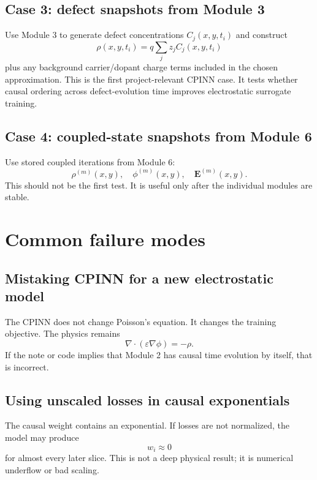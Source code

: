 \documentclass[11pt]{article}
\newcommand{\Evec}{\mathbf{E}}
\begin{document}
\subsection{Case 3: defect snapshots from Module 3}

Use Module 3 to generate defect concentrations $C_j(x,y,t_i)$ and construct
\begin{equation}
\rho(x,y,t_i)=q\sum_j z_jC_j(x,y,t_i)
\end{equation}
plus any background carrier/dopant charge terms included in the chosen approximation. This is the first project-relevant CPINN case. It tests whether causal ordering across defect-evolution time improves electrostatic surrogate training.

\subsection{Case 4: coupled-state snapshots from Module 6}

Use stored coupled iterations from Module 6:
\begin{equation}
\rho^{(m)}(x,y),\quad \phi^{(m)}(x,y),\quad \Evec^{(m)}(x,y).
\end{equation}
This should not be the first test. It is useful only after the individual modules are stable.

\section{Common failure modes}

\subsection{Mistaking CPINN for a new electrostatic model}

The CPINN does not change Poisson's equation. It changes the training objective. The physics remains
\begin{equation}
\nabla\cdot(\varepsilon\nabla\phi)=-\rho.
\end{equation}
If the note or code implies that Module 2 has causal time evolution by itself, that is incorrect.

\subsection{Using unscaled losses in causal exponentials}

The causal weight contains an exponential. If losses are not normalized, the model may produce
\begin{equation}
w_i\approx 0
\end{equation}
for almost every later slice. This is not a deep physical result; it is numerical underflow or bad scaling.
\end{document}
